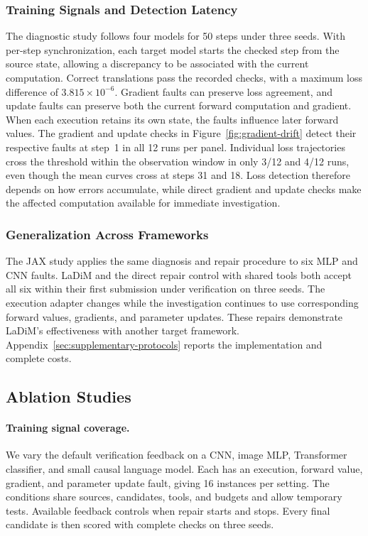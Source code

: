 \subsubsection{Training Signals and Detection Latency}

The diagnostic study follows four models for 50 steps under three seeds. With per-step synchronization, each target model starts the checked step from the source state, allowing a discrepancy to be associated with the current computation. Correct translations pass the recorded checks, with a maximum loss difference of $3.815\times10^{-6}$. Gradient faults can preserve loss agreement, and update faults can preserve both the current forward computation and gradient. When each execution retains its own state, the faults influence later forward values. The gradient and update checks in Figure~\ref{fig:gradient-drift} detect their respective faults at step~1 in all 12 runs per panel. Individual loss trajectories cross the threshold within the observation window in only 3/12 and 4/12 runs, even though the mean curves cross at steps 31 and 18. Loss detection therefore depends on how errors accumulate, while direct gradient and update checks make the affected computation available for immediate investigation.

\subsubsection{Generalization Across Frameworks}
\label{sec:generalization}

The JAX study applies the same diagnosis and repair procedure to six MLP and CNN faults. LaDiM and the direct repair control with shared tools both accept all six within their first submission under verification on three seeds. The execution adapter changes while the investigation continues to use corresponding forward values, gradients, and parameter updates. These repairs demonstrate LaDiM's effectiveness with another target framework. Appendix~\ref{sec:supplementary-protocols} reports the implementation and complete costs.

\subsection{Ablation Studies}
\label{sec:ablations}

\paragraph{Training signal coverage.}
We vary the default verification feedback on a CNN, image MLP, Transformer classifier, and small causal language model. Each has an execution, forward value, gradient, and parameter update fault, giving 16 instances per setting. The conditions share sources, candidates, tools, and budgets and allow temporary tests. Available feedback controls when repair starts and stops. Every final candidate is then scored with complete checks on three seeds.

